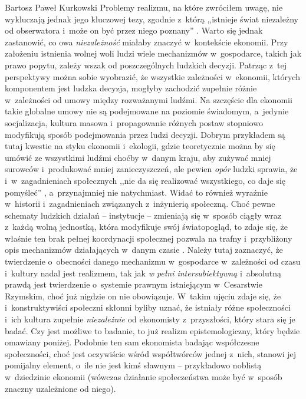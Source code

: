 \begin{artplenv}{Bartosz Paweł Kurkowski}
Problemy realizmu, na które zwróciłem uwagę, nie wykluczają jednak jego kluczowej tezy, zgodnie z~którą ,,istnieje świat
niezależny od obserwatora i~może on być przez niego poznany''
\parencite[s.~16]{hardt_studia_2013}.
Warto się
jednak zastanowić, co owa \textit{niezależność} miałaby znaczyć w~kontekście ekonomii. Przy założeniu istnienia wolnej
woli ludzi wiele mechanizmów w~gospodarce, takich jak prawo popytu, zależy wszak od poszczególnych ludzkich decyzji.
Patrząc z~tej perspektywy można sobie wyobrazić, że wszystkie zależności w~ekonomii, których komponentem jest ludzka
decyzja, mogłyby zachodzić zupełnie różnie w~zależności od umowy między rozważanymi ludźmi. Na szczęście dla ekonomii
takie globalne umowy nie są podejmowane na poziomie świadomym, a~jedynie socjalizacja, kultura masowa i~propagowanie
różnych postaw stopniowo modyfikują sposób podejmowania przez ludzi decyzji. Dobrym przykładem są tutaj kwestie na
styku ekonomii i~ekologii, gdzie teoretycznie można by się umówić ze wszystkimi ludźmi choćby w~danym kraju, aby zużywać mniej
surowców i~produkować mniej zanieczyszczeń, ale pewien \textit{opór} ludzki sprawia, że i~w~zagadnieniach społecznych
,,nie da się realizować wszystkiego, co daje się pomyśleć''
\parencite[s.~42]{zboron_teorie_2009},
a~przynajmniej nie natychmiast. Widać to również wyraźnie w~historii i~zagadnieniach związanych z~inżynierią społeczną.
Choć pewne schematy ludzkich działań -- instytucje -- zmieniają się w~sposób ciągły wraz z~każdą wolną jednostką, która
modyfikuje swój światopogląd, to zdaje się, że właśnie ten brak pełnej koordynacji społecznej pozwala na
trafny i~przybliżony opis mechanizmów działających w~danym czasie
\parencite[s.~21]{hardt_studia_2013}.
Należy
tutaj zaznaczyć, że twierdzenie o~obecności danego mechanizmu w~gospodarce w~zależności od czasu i~kultury nadal jest
realizmem, tak jak \textit{w pełni intersubiektywną} i~absolutną prawdą jest twierdzenie o~systemie prawnym istniejącym
w~Cesarstwie Rzymskim, choć już nigdzie on nie obowiązuje. W~takim ujęciu zdaje się, że i~konstruktywiści społeczni
skłonni byliby uznać, że istniały różne społeczności i~ich kultura zupełnie \textit{niezależnie} od
ekonomisty z~przyszłości, który stara się je badać. Czy jest możliwe to badanie, to już realizm epistemologiczny, %
który będzie
omawiany poniżej. Podobnie ten sam ekonomista badając współczesne społeczności, choć jest oczywiście wśród współtwórców
jednej z~nich, stanowi jej pomijalny element, o~ile nie jest kimś sławnym -- przykładowo noblistą w~dziedzinie ekonomii
(wówczas działanie społeczeństwa może być w~sposób znaczny uzależnione od niego).



\end{artplenv}
